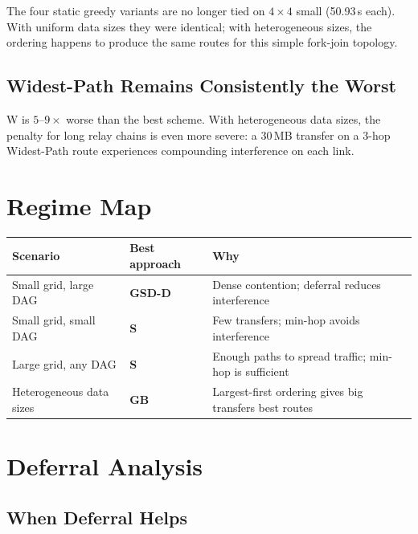 \documentclass[11pt]{article}
\begin{document}
The four static greedy variants are no longer tied on $4\times4$ small
(50.93\,s each).  With uniform data sizes they were identical; with
heterogeneous sizes, the ordering happens to produce the same routes for
this simple fork-join topology.

\subsection{Widest-Path Remains Consistently the Worst}

W is $5$--$9\times$ worse than the best scheme.  With heterogeneous data
sizes, the penalty for long relay chains is even more severe: a 30\,MB
transfer on a 3-hop Widest-Path route experiences compounding interference
on each link.

\section{Regime Map}

\begin{table}[h]
\centering
\begin{tabular}{lll}
\toprule
\textbf{Scenario} & \textbf{Best approach} & \textbf{Why} \\
\midrule
Small grid, large DAG    & \textbf{GSD-D} & Dense contention; deferral reduces interference \\
Small grid, small DAG    & \textbf{S}     & Few transfers; min-hop avoids interference \\
Large grid, any DAG      & \textbf{S}     & Enough paths to spread traffic; min-hop is sufficient \\
Heterogeneous data sizes & \textbf{GB}    & Largest-first ordering gives big transfers best routes \\
\bottomrule
\end{tabular}
\end{table}

\section{Deferral Analysis}

\subsection{When Deferral Helps}
\end{document}
